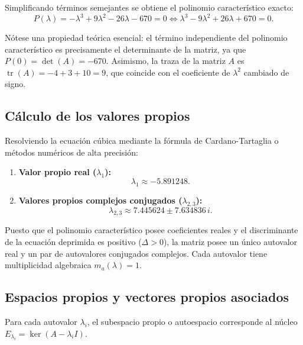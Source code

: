 \documentclass[spanish,letterpaper,oneside]{article}
\begin{document}
Simplificando términos semejantes se obtiene el polinomio característico exacto:
\begin{equation}
P(\lambda) = -\lambda^3 + 9\lambda^2 - 26\lambda - 670 = 0 \iff \lambda^3 - 9\lambda^2 + 26\lambda + 670 = 0.
\end{equation}

Nótese una propiedad teórica esencial: el término independiente del polinomio característico es precisamente el determinante de la matriz, ya que $P(0) = \det(A) = -670$. Asimismo, la traza de la matriz $A$ es $\operatorname{tr}(A) = -4 + 3 + 10 = 9$, que coincide con el coeficiente de $\lambda^2$ cambiado de signo.

\subsection{Cálculo de los valores propios}
Resolviendo la ecuación cúbica mediante la fórmula de Cardano-Tartaglia o métodos numéricos de alta precisión:
\begin{enumerate}
\item \textbf{Valor propio real ($\lambda_1$):}
\begin{equation}
\lambda_1 \approx -5.891248.
\end{equation}
\item \textbf{Valores propios complejos conjugados ($\lambda_{2,3}$):}
\begin{equation}
\lambda_{2,3} \approx 7.445624 \pm 7.634836 \, i.
\end{equation}
\end{enumerate}

Puesto que el polinomio característico posee coeficientes reales y el discriminante de la ecuación deprimida es positivo ($\Delta > 0$), la matriz posee un único autovalor real y un par de autovalores conjugados complejos. Cada autovalor tiene multiplicidad algebraica $m_a(\lambda) = 1$.

\subsection{Espacios propios y vectores propios asociados}
Para cada autovalor $\lambda_i$, el subespacio propio o autoespacio corresponde al núcleo $E_{\lambda_i} = \ker(A - \lambda_i I)$.
\end{document}
